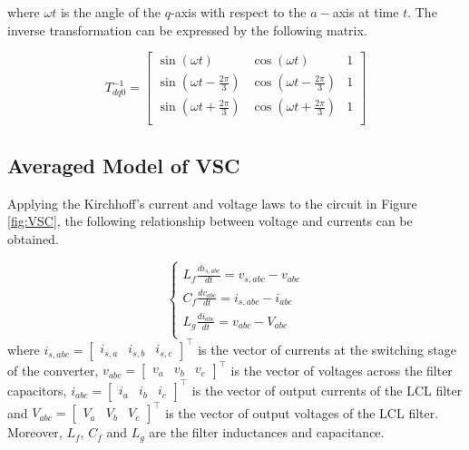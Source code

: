 \noindent where $\omega t$ is the angle of the $q$-axis with respect to the
$a-$axis at time $t$. The inverse transformation can be expressed by the
following matrix.

\begin{equation}
    T_{dq0}^{-1} = 
    \begin{bmatrix}
        \sin{(\omega t)} & \cos{(\omega t)} & 1 \\
        \sin{(\omega t-\frac{2\pi}{3})} & \cos{(\omega t-\frac{2\pi}{3})} & 1 \\
        \sin{(\omega t+\frac{2\pi}{3})} & \cos{(\omega t+\frac{2\pi}{3})} & 1 \\
    \end{bmatrix}
    \label{eq:park_inverse_transformation}
\end{equation}

\subsection{Averaged Model of VSC}

Applying the Kirchhoff's current and voltage laws to the circuit in Figure
\ref{fig:VSC}, the following relationship between voltage and currents can be
obtained.

\begin{equation}
    \begin{cases}
        L_f \frac{di_{s,abc}}{dt} = v_{s,abc} - v_{abc}\\
        C_f \frac{dv_{abc}}{dt} = i_{s,abc} - i_{abc}\\
        L_g \frac{di_{abc}}{dt} = v_{abc} - V_{abc}\\
    \end{cases}
    \label{eq:vsc_abc}
\end{equation}
\noindent where $i_{s,abc} = \begin{bmatrix}i_{s,a} & i_{s,b}
&i_{s,c}\end{bmatrix}^\top$ is the vector of currents at the switching stage of
the converter, $v_{abc} = \begin{bmatrix}v_{a} & v_{b} &
v_{c}\end{bmatrix}^\top$ is the vector of voltages across the filter capacitors,
$i_{abc} = \begin{bmatrix}i_{a} & i_{b} &i_{c}\end{bmatrix}^\top$ is the vector
of output currents of the LCL filter and $V_{abc} = \begin{bmatrix}V_{a} & V_{b}
&V_{c}\end{bmatrix}^\top$ is the vector of output voltages of the LCL filter.
Moreover, $L_f$, $C_f$ and $L_g$ are the filter inductances and capacitance.

